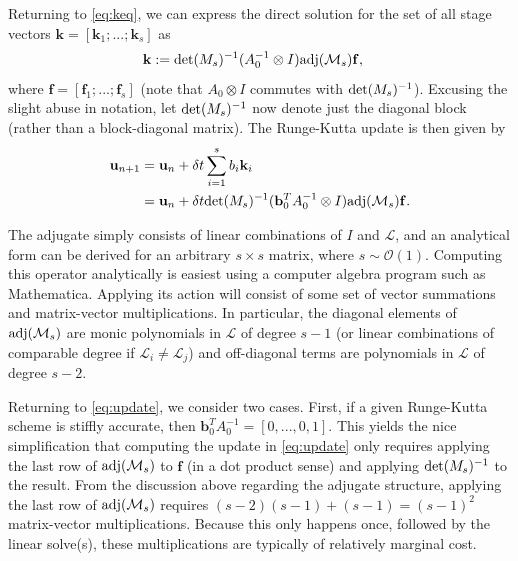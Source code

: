 \documentclass[review]{siamart}
\begin{document}
Returning to \eqref{eq:keq}, we can express the direct solution for the set of all
stage vectors ${\mathbf{k}} = [\mathbf{k}_1; ...; \mathbf{k}_s]$ as
%
\begin{align*}
\mathbf{k} &:= \textnormal{det}({M}_s)^{-1}
	(A_0^{-1}\otimes I)\textnormal{adj}(\mathcal{M}_s)\mathbf{f},
\end{align*}
%
where $\mathbf{f} = [\mathbf{f}_1; ...; \mathbf{f}_s]$ (note that
$A_0\otimes I$ commutes with $\textnormal{det}({M}_s)^{-1}$). Excusing the slight
abuse in notation, let $\textnormal{det}({M}_s)^{-1}$ now denote just the diagonal
block (rather than a block-diagonal matrix). The Runge-Kutta update is then given by
%
\begin{align}\nonumber
\mathbf{u}_{n+1} & = \mathbf{u}_n + \delta t\sum_{i=1}^s b_i{\mathbf{k}}_i \\
& = \mathbf{u}_n + \delta t\textnormal{det}({M}_s)^{-1}
	(\mathbf{b}_0^TA_0^{-1}\otimes I)\textnormal{adj}(\mathcal{M}_s)\mathbf{f}.\label{eq:update}
\end{align}
%

The adjugate simply consists of linear combinations of $I$ and $\mathcal{L}$, and an
analytical form can be derived for an arbitrary $s\times s$ matrix, where $s\sim\mathcal{O}(1)$.
Computing this operator analytically is easiest using a computer algebra program
such as Mathematica. Applying its action will consist of some set of vector summations
and matrix-vector multiplications. In particular, the diagonal elements of
$\textnormal{adj}(\mathcal{M}_s)$ are monic polynomials in $\mathcal{L}$ of degree
$s-1$ (or linear combinations of comparable degree if $\mathcal{L}_i\neq\mathcal{L}_j$)
and off-diagonal terms are polynomials in $\mathcal{L}$ of degree $s-2$. 

Returning to \eqref{eq:update}, we consider two cases. First, if a given Runge-Kutta
scheme is stiffly accurate, then $\mathbf{b}_0^TA_0^{-1} = [0,...,0,1]$. This yields
the nice simplification that computing the update in \eqref{eq:update} only requires
applying the last row of $\textnormal{adj}(\mathcal{M}_s)$ to $\mathbf{f}$ (in a
dot product sense) and applying $\textnormal{det}({M}_s)^{-1}$ to the result. From
the discussion above regarding the adjugate structure, applying the last row of
$\textnormal{adj}(\mathcal{M}_s)$ requires $(s-2)(s-1) + (s-1) = (s-1)^2$ matrix-vector
multiplications. Because this only happens once, followed by the linear solve(s),
these multiplications are typically of relatively marginal cost.
\end{document}
